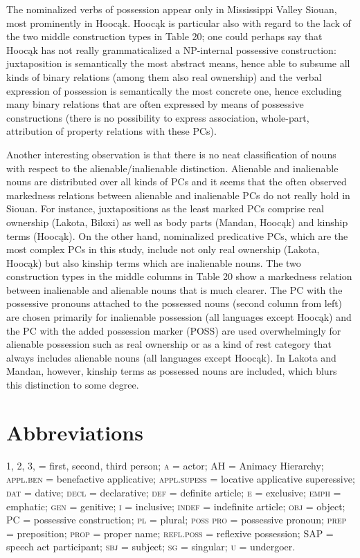 \documentclass[output=paper]{LSP/langsci}
\begin{document}
The nominalized verbs of possession appear only in Mississippi Valley Siouan, most prominently in Hoocąk. Hoocąk is particular also with regard to the lack of the two middle construction types in Table 20; one could perhaps say that Hoocąk has not really grammaticalized a NP-internal possessive construction:  juxtaposition is semantically the most abstract means, hence able to subsume all kinds of binary relations (among them also real ownership) and the verbal expression of possession is semantically the most concrete one, hence excluding many binary relations that are often expressed by means of possessive constructions (there is no possibility to express association, whole-part, attribution of property relations with these PCs).

Another interesting observation is that there is no neat classification of nouns with respect to the alienable/inalienable distinction. Alienable and inalienable nouns are distributed over all kinds of PCs and it seems that the often observed markedness relations between alienable and inalienable PCs do not really hold in Siouan. For instance, juxtapositions as the least marked PCs comprise real ownership (Lakota, Biloxi) as well as body parts (Mandan, Hoocąk) and kinship terms (Hoocąk). On the other hand, nominalized predicative PCs, which are the most complex PCs in this study, include not only real ownership (Lakota, Hoocąk) but also kinship terms which are inalienable nouns. The two construction types in the middle columns in Table 20 show a markedness relation between inalienable and alienable nouns that is much clearer. The PC with the possessive pronouns attached to the possessed nouns (second column from left) are chosen primarily for inalienable possession (all languages except Hoocąk) and the PC with the added possession marker (\textsc{POSS}) are used overwhelmingly for alienable possession such as real ownership or as a kind of rest category that always includes alienable nouns (all languages except Hoocąk). In Lakota and Mandan, however, kinship terms as possessed nouns are included, which blurs this distinction to some degree. 
   
\section*{Abbreviations}

1, 2, 3, = first, second, third person; \textsc{a} = actor; AH = Animacy Hierarchy; \textsc{appl.ben} = benefactive applicative; \textsc{appl.supess} = locative applicative superessive; \textsc{dat} = dative; \textsc{decl} = declarative; \textsc{def} = definite article; \textsc{e} = exclusive; \textsc{emph} = emphatic; \textsc{gen} = genitive; \textsc{i} = inclusive; \textsc{indef} = indefinite article; \textsc{obj} = object; PC = possessive construction; \textsc{pl} = plural; \textsc{poss pro} = possessive pronoun; \textsc{prep} = preposition; \textsc{prop} = proper name; \textsc{refl.poss} = reflexive possession; SAP = speech act participant; \textsc{sbj} = subject; \textsc{sg} = singular; \textsc{u} = undergoer.
 \printbibliography[heading=subbibliography,notkeyword=this]
 
\end{document}
